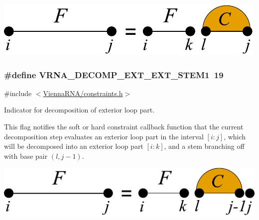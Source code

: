  
\begin{DoxyImageNoCaption}
  \mbox{\includegraphics[width=\textwidth,height=\textheight/2,keepaspectratio=true]{decomp_ext_ext_stem}}
\end{DoxyImageNoCaption}
 \hypertarget{group__constraints_ga2e75d7a77118735b32f25422d9686719}{}
\subsubsection[{V\+R\+N\+A\+\_\+\+D\+E\+C\+O\+M\+P\+\_\+\+E\+X\+T\+\_\+\+E\+X\+T\+\_\+\+S\+T\+E\+M1}]{\setlength{\rightskip}{0pt plus 5cm}\#define V\+R\+N\+A\+\_\+\+D\+E\+C\+O\+M\+P\+\_\+\+E\+X\+T\+\_\+\+E\+X\+T\+\_\+\+S\+T\+E\+M1~19}\label{group__constraints_ga2e75d7a77118735b32f25422d9686719}


{\ttfamily \#include $<$\hyperlink{constraints_8h}{Vienna\+R\+N\+A/constraints.\+h}$>$}



Indicator for decomposition of exterior loop part. 

This flag notifies the soft or hard constraint callback function that the current decomposition step evaluates an exterior loop part in the interval $[i:j]$, which will be decomposed into an exterior loop part $[i:k]$, and a stem branching off with base pair $(l,j-1)$.

 
\begin{DoxyImageNoCaption}
  \mbox{\includegraphics[width=\textwidth,height=\textheight/2,keepaspectratio=true]{decomp_ext_ext_stem1}}
\end{DoxyImageNoCaption}
 

